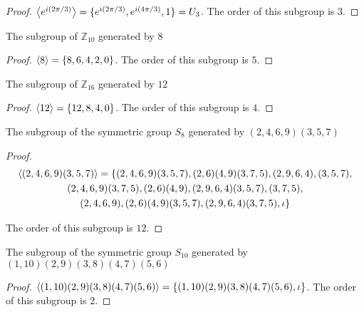 \begin{proof}
    $\left\langle{e^{i(2\pi/3)}}\right\rangle = \{ e^{i(2\pi/3)}, e^{i(4\pi/3)}, 1 \} = U_{3}$. The order of this subgroup is $3$.
\end{proof}

\begin{exercise}
    The subgroup of $\mathbb{Z}_{10}$ generated by $8$
\end{exercise}

\begin{proof}
    $\left\langle{8}\right\rangle = \{ 8, 6, 4, 2, 0 \}$. The order of this subgroup is $5$.
\end{proof}

\begin{exercise}
    The subgroup of $\mathbb{Z}_{16}$ generated by $12$
\end{exercise}

\begin{proof}
    $\left\langle{12}\right\rangle = \{ 12, 8, 4, 0 \}$. The order of this subgroup is $4$.
\end{proof}

\begin{exercise}
    The subgroup of the symmetric group $S_{8}$ generated by $(2, 4, 6, 9)(3, 5, 7)$
\end{exercise}

\begin{proof}
    \begin{multline*}
        \left\langle{(2, 4, 6, 9)(3, 5, 7)}\right\rangle = \{ (2, 4, 6, 9)(3, 5, 7), (2, 6)(4, 9)(3, 7, 5), (2, 9, 6, 4), (3, 5, 7), \\
        (2, 4, 6, 9)(3, 7, 5), (2, 6)(4, 9), (2, 9, 6, 4)(3, 5, 7), (3, 7, 5), \\
        (2, 4, 6, 9), (2, 6)(4, 9)(3, 5, 7), (2, 9, 6, 4)(3, 7, 5), \iota \}
    \end{multline*}

    The order of this subgroup is $12$.
\end{proof}

\begin{exercise}
    The subgroup of the symmetric group $S_{10}$ generated by $(1, 10)(2, 9)(3, 8)(4, 7)(5, 6)$
\end{exercise}

\begin{proof}
    $\left\langle{(1, 10)(2, 9)(3, 8)(4, 7)(5, 6)}\right\rangle = \{ (1, 10)(2, 9)(3, 8)(4, 7)(5, 6), \iota \}$. The order of this subgroup is $2$.
\end{proof}

